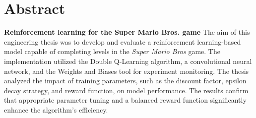 \section*{Abstract}

\noindent\textbf{Reinforcement learning for the Super Mario Bros. game}
The aim of this engineering thesis was to develop and evaluate a reinforcement learning-based model capable of completing levels in the \textit{Super Mario Bros} game. The implementation utilized the Double Q-Learning algorithm, a convolutional neural network, and the Weights and Biases tool for experiment monitoring. The thesis analyzed the impact of training parameters, such as the discount factor, epsilon decay strategy, and reward function, on model performance. The results confirm that appropriate parameter tuning and a balanced reward function significantly enhance the algorithm's efficiency.
